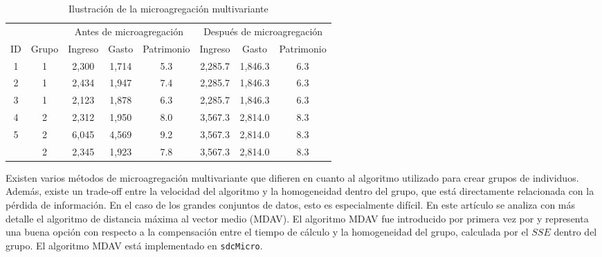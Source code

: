 \documentclass[
]{book}
\theoremstyle{definition}
\theoremstyle{definition}
\theoremstyle{definition}
\theoremstyle{definition}
\theoremstyle{remark}
\begin{document}
\begin{table}

\caption{\label{tab:Tabla17}\label{tab:Tabla17}Ilustración de la microagregación multivariante}
\centering
\begin{tabular}[t]{cccccccc}
\toprule
\multicolumn{2}{c}{ } & \multicolumn{3}{c}{Antes de microagregación} & \multicolumn{3}{c}{Después de microagregación} \\
\cmidrule(l{3pt}r{3pt}){3-5} \cmidrule(l{3pt}r{3pt}){6-8}
ID & Grupo & Ingreso & Gasto & Patrimonio & Ingreso & Gasto & Patrimonio\\
\midrule
1 & 1 & 2,300 & 1,714 & 5.3 & 2,285.7 & 1,846.3 & 6.3\\
2 & 1 & 2,434 & 1,947 & 7.4 & 2,285.7 & 1,846.3 & 6.3\\
3 & 1 & 2,123 & 1,878 & 6.3 & 2,285.7 & 1,846.3 & 6.3\\
4 & 2 & 2,312 & 1,950 & 8.0 & 3,567.3 & 2,814.0 & 8.3\\
5 & 2 & 6,045 & 4,569 & 9.2 & 3,567.3 & 2,814.0 & 8.3\\
\addlinespace
6 & 2 & 2,345 & 1,923 & 7.8 & 3,567.3 & 2,814.0 & 8.3\\
\bottomrule
\end{tabular}
\end{table}

Existen varios métodos de microagregación multivariante que difieren en cuanto al algoritmo utilizado para crear grupos de individuos. Además, existe un trade-off entre la velocidad del algoritmo y la homogeneidad dentro del grupo, que está directamente relacionada con la pérdida de información. En el caso de los grandes conjuntos de datos, esto es especialmente difícil. En este artículo se analiza con más detalle el algoritmo de distancia máxima al vector medio (MDAV). El algoritmo MDAV fue introducido por primera vez por \citep{DoTo05} y representa una buena opción con respecto a la compensación entre el tiempo de cálculo y la homogeneidad del grupo, calculada por el \(SSE\) dentro del grupo. El algoritmo MDAV está implementado en \texttt{sdcMicro}.
\end{document}
